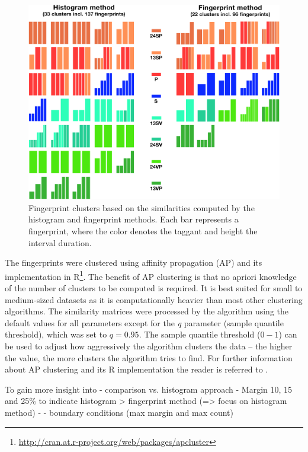 \documentclass[thesis.tex]{subfiles}
\begin{document}
\begin{figure}[h]
\label{figure:clusters}
\centering \includegraphics[page=1,width=\textwidth,height=\textheight,keepaspectratio=true]{images/experiment/clusters}
\caption{Fingerprint clusters based on the similarities computed by the histogram and fingerprint methods. Each bar represents a fingerprint, where the color denotes the taggant and height the interval duration.}
\end{figure}

The fingerprints were clustered using affinity propagation (AP) and its implementation in R\footnote{\url{http://cran.at.r-project.org/web/packages/apcluster}}. The benefit of AP clustering is that no apriori knowledge of the number of clusters to be computed is required. It is best suited for small to medium-sized datasets as it is computationally heavier than most other clustering algorithms. The similarity matrices were processed by the algorithm using the default values for all parameters except for the \emph{q} parameter (sample quantile threshold), which was set to $q=0.95$. The sample quantile threshold ($0-1$) can be used to adjust how aggressively the algorithm clusters the data -- the higher the value, the more clusters the algorithm tries to find. For further information about AP clustering and its R implementation the reader is referred to \cite{affinity_propagation}.

To gain more insight into
- comparison vs. histogram approach
- Margin 10, 15 and 25\% to indicate histogram > fingerprint method (=> focus on histogram method)
  - - boundary conditions (max margin and max count)
\end{document}
